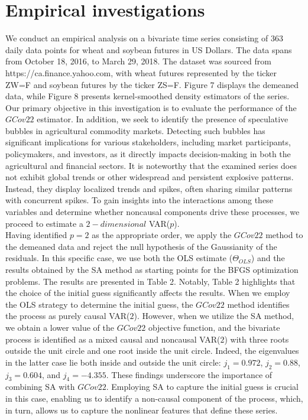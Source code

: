 \documentclass[<1p>]{elsarticle} %
\begin{document}
\section{\textbf{Empirical investigations}}
We conduct an empirical analysis on a bivariate time series consisting of 363 daily data points for wheat and soybean futures in US Dollars. The data spans from October 18, 2016, to March 29, 2018. The dataset was sourced from https://ca.finance.yahoo.com, with wheat futures represented by the ticker ZW=F and soybean futures by the ticker ZS=F. Figure 7 displays the demeaned data, while Figure 8 presents kernel-smoothed density estimators of the series.\\
\indent Our primary objective in this investigation is to evaluate the performance of the $GCov22$ estimator. In addition, we seek to identify the presence of speculative bubbles in agricultural commodity markets. Detecting such bubbles has significant implications for various stakeholders, including market participants, policymakers, and investors, as it directly impacts decision-making in both the agricultural and financial sectors. It is noteworthy that the examined series does not exhibit global trends or other widespread and persistent explosive patterns. Instead, they display localized trends and spikes, often sharing similar patterns with concurrent spikes. To gain insights into the interactions among these variables and determine whether noncausal components drive these processes, we proceed to estimate a $2-dimensional$ VAR($p$).\\
\indent Having identified $p=2$ as the appropriate order, we apply the $GCov22$ method to the demeaned data and reject the null hypothesis of the Gaussianity of the residuals. In this specific case, we use both the OLS estimate ($\Theta_{OLS}$) and the results obtained by the SA method as starting points for the BFGS optimization problems. The results are presented in Table 2. Notably, Table 2 highlights that the choice of the initial guess significantly affects the results. When we employ the OLS strategy to determine the initial guess, the $GCov22$ method identifies the process as purely causal VAR($2$). However, when we utilize the SA method, we obtain a lower value of the $GCov22$ objective function, and the bivariate process is identified as a mixed causal and noncausal VAR($2$) with three roots outside the unit circle and one root inside the unit circle. Indeed, the eigenvalues in the latter case lie both inside and outside the unit circle: $j_1=0.972$, $j_2=0.88$, $j_3=0.604$, and $j_4=-4.355$. These findings underscore the importance of combining SA with $GCov22$. Employing SA to capture the initial guess is crucial in this case, enabling us to identify a non-causal component of the process, which, in turn, allows us to capture the nonlinear features that define these series.
\end{document}
